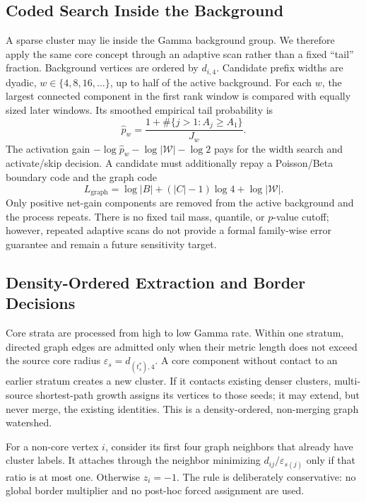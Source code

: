 \documentclass[conference]{IEEEtran}
\begin{document}
\subsection{Coded Search Inside the Background}
A sparse cluster may lie inside the Gamma background group. We therefore apply the same core concept through an adaptive scan rather than a fixed ``tail'' fraction. Background vertices are ordered by $d_{i,4}$. Candidate prefix widths are dyadic, $w\in\{4,8,16,\ldots\}$, up to half of the active background. For each $w$, the largest connected component in the first rank window is compared with equally sized later windows. Its smoothed empirical tail probability is
\begin{equation}
 \hat p_w=\frac{1+\#\{j>1:A_j\ge A_1\}}{J_w}.
\end{equation}
The activation gain $-\log\hat p_w-\log|\mathcal W|-\log 2$ pays for the width search and activate/skip decision. A candidate must additionally repay a Poisson/Beta boundary code and the graph code
\begin{equation}
 L_{\mathrm{graph}}=\log |B|+(|C|-1)\log 4+\log|\mathcal W|.
\end{equation}
Only positive net-gain components are removed from the active background and the process repeats. There is no fixed tail mass, quantile, or $p$-value cutoff; however, repeated adaptive scans do not provide a formal family-wise error guarantee and remain a future sensitivity target.

\subsection{Density-Ordered Extraction and Border Decisions}
Core strata are processed from high to low Gamma rate. Within one stratum, directed graph edges are admitted only when their metric length does not exceed the source core radius $\varepsilon_s=d_{(t_s^*),4}$. A core component without contact to an earlier stratum creates a new cluster. If it contacts existing denser clusters, multi-source shortest-path growth assigns its vertices to those seeds; it may extend, but never merge, the existing identities. This is a density-ordered, non-merging graph watershed.

For a non-core vertex $i$, consider its first four graph neighbors that already have cluster labels. It attaches through the neighbor minimizing $d_{ij}/\varepsilon_{s(j)}$ only if that ratio is at most one. Otherwise $z_i=-1$. The rule is deliberately conservative: no global border multiplier and no post-hoc forced assignment are used.
\end{document}
